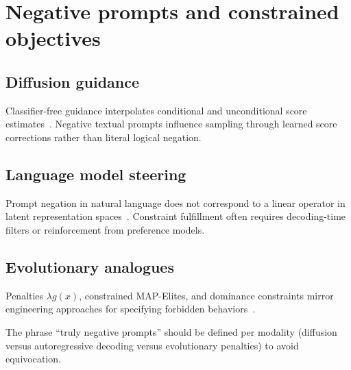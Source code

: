 \section{Negative prompts and constrained objectives}
\label{sec:neg}

\subsection{Diffusion guidance}
Classifier-free guidance interpolates conditional and unconditional score estimates~\cite{ho2022classifier}.
Negative textual prompts influence sampling through learned score corrections rather than literal logical negation.

\subsection{Language model steering}
Prompt negation in natural language does not correspond to a linear operator in latent representation spaces~\cite{raffel2020exploring}.
Constraint fulfillment often requires decoding-time filters or reinforcement from preference models.

\subsection{Evolutionary analogues}
Penalties $\lambda g(x)$, constrained MAP-Elites, and dominance constraints mirror engineering approaches for specifying forbidden behaviors~\cite{deb2002fast}.

\begin{remark}
The phrase ``truly negative prompts'' should be defined per modality (diffusion versus autoregressive decoding versus evolutionary penalties) to avoid equivocation.
\end{remark}
